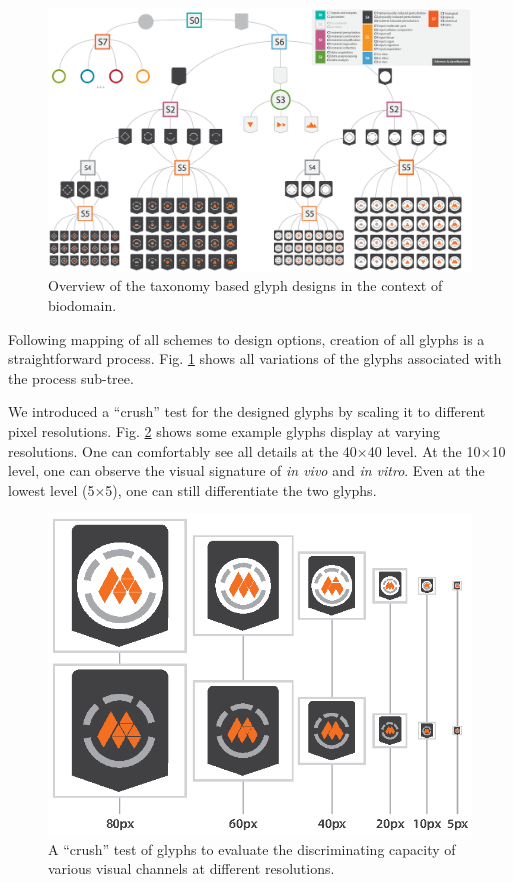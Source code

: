 \begin{figure}[t!]
\centering
\includegraphics[scale=0.465]{images/glyph-taxonomy/full-tree.eps}
\caption{Overview of the taxonomy based glyph designs in the context of biodomain.}
\label{fig:full-tree}
\vspace{-5pt}
\end{figure}

Following mapping of all schemes to design options, creation of all glyphs is a straightforward process.
Fig. \ref{fig:full-tree} shows all variations of the glyphs associated with the process sub-tree.

We introduced a ``crush'' test for the designed glyphs by scaling it to different pixel resolutions.
Fig. \ref{fig:crash-test} shows some example glyphs display at varying resolutions.
One can comfortably see all details at the 40$\times$40 level.
At the 10$\times$10 level, one can observe the visual signature of \emph{in vivo} and \emph{in vitro}.
Even at the lowest level (5$\times$5), one can still differentiate the two glyphs. 

\begin{figure}[t!]
\centering
\includegraphics[scale=1]{images/glyph-taxonomy/crash-test.eps}
\caption{A ``crush'' test of glyphs to evaluate the discriminating capacity of various visual channels at different resolutions.}
\label{fig:crash-test}
\vspace{-5pt}
\end{figure}

